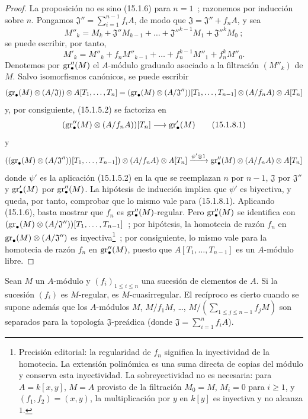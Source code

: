 \begin{proof}
La proposición no es sino (15.1.6) para $n=1$~; razonemos por inducción sobre
$n$. Pongamos
$\mathfrak{J}''=\sum_{i=1}^{n-1}f_iA$,
de modo que $\mathfrak{J}=\mathfrak{J}''+f_nA$, y sea
\[
  M''_k=M_k+\mathfrak{J}''M_{k-1}+\ldots+
  \mathfrak{J}''^{k-1}M_1+\mathfrak{J}''^kM_0~;
\]
se puede escribir, por tanto,
\[
  M'_k=M''_k+f_nM''_{k-1}+\ldots+f_n^{k-1}M''_1+f_n^kM''_0.
\]
Denotemos por $\operatorname{gr}''_\bullet(M)$ el $A$-módulo graduado asociado a la filtración
$(M''_k)$ de $M$. Salvo isomorfismos canónicos, se puede escribir
\[
  (\operatorname{gr}_\bullet(M)\otimes(A/\mathfrak{J}))\otimes A[T_1,\ldots,T_n]
  =
  (\operatorname{gr}_\bullet(M)\otimes(A/\mathfrak{J}''))[T_1,\ldots,T_{n-1}]
  \otimes(A/f_nA)\otimes A[T_n]
\]
y, por consiguiente, (15.1.5.2) se factoriza en
\[
  (\operatorname{gr}''_\bullet(M)\otimes(A/f_nA))[T_n]\longrightarrow\operatorname{gr}'_\bullet(M)
  \tag{15.1.8.1}\label{0.15.1.8.1-fr}
\]
y
\[
  ((\operatorname{gr}_\bullet(M)\otimes(A/\mathfrak{J}''))[T_1,\ldots,T_{n-1}])
  \otimes(A/f_nA)\otimes A[T_n]
  \xrightarrow{\psi'\otimes1}
  \operatorname{gr}''_\bullet(M)\otimes(A/f_nA)\otimes A[T_n]
\]
donde $\psi'$ es la aplicación (15.1.5.2) en la que se reemplazan $n$ por
$n-1$, $\mathfrak{J}$ por $\mathfrak{J}''$ y $\operatorname{gr}'_\bullet(M)$ por
$\operatorname{gr}''_\bullet(M)$. La hipótesis de inducción implica que $\psi'$ es
biyectiva, y queda, por tanto, comprobar que lo mismo vale para (15.1.8.1).
Aplicando (15.1.6), basta mostrar que $f_n$ es
$\operatorname{gr}''_\bullet(M)$-regular. Pero $\operatorname{gr}''_\bullet(M)$ se identifica con
$(\operatorname{gr}_\bullet(M)\otimes(A/\mathfrak{J}''))[T_1,\ldots,T_{n-1}]$~;
por hipótesis, la homotecia de razón $f_n$ en
$\operatorname{gr}_\bullet(M)\otimes(A/\mathfrak{J}'')$ es inyectiva\footnote{Precisión editorial: la regularidad de $f_n$ significa la inyectividad de la homotecia. La extensión polinómica es una suma directa de copias del módulo y conserva esta inyectividad. La sobreyectividad no es necesaria: para $A=k[x,y]$, $M=A$ provisto de la filtración $M_0=M$, $M_i=0$ para $i\geq1$, y $(f_1,f_2)=(x,y)$, la multiplicación por $y$ en $k[y]$ es inyectiva y no alcanza $1$.}~; por consiguiente, lo
mismo vale para la homotecia de razón $f_n$ en $\operatorname{gr}''_\bullet(M)$, puesto que
$A[T_1,\ldots,T_{n-1}]$ es un $A$-módulo libre.
\end{proof}
\begin{proposition}[15.1.9]
\label{0.15.1.9-fr}
Sean $M$ un $A$-módulo y $(f_i)_{1\leq i\leq n}$ una sucesión de elementos de
$A$. Si la sucesión $(f_i)$ es $M$-regular, es $M$-cuasirregular. El recíproco
es cierto cuando se supone además que los $A$-módulos
$M$, $M/f_1M$, \ldots, $M/\left(\sum_{1\leq j\leq n-1}f_jM\right)$
son separados para la topología $\mathfrak{J}$-preádica (donde
$\mathfrak{J}=\sum_{i=1}^n f_iA$).
\end{proposition}

